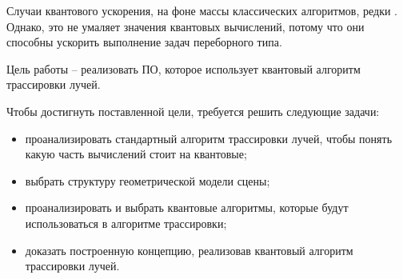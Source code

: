 Случаи квантового ускорения, на фоне массы классических алгоритмов, редки \cite{quantum-computers-speed-up}. Однако, это не умаляет значения квантовых вычислений, потому что они способны ускорить выполнение задач переборного типа. 

Цель работы -- реализовать ПО, которое
использует квантовый алгоритм трассировки лучей.

Чтобы достигнуть поставленной цели, требуется решить следующие задачи:

\begin{itemize}
    \item проанализировать стандартный алгоритм трассировки лучей, чтобы
понять какую часть вычислений стоит на квантовые;
    \item выбрать структуру геометрической модели сцены;
    \item проанализировать и выбрать квантовые алгоритмы, которые будут использоваться в алгоритме трассировки;
    \item доказать построенную концепцию, реализовав квантовый алгоритм трассировки лучей.
\end{itemize}
